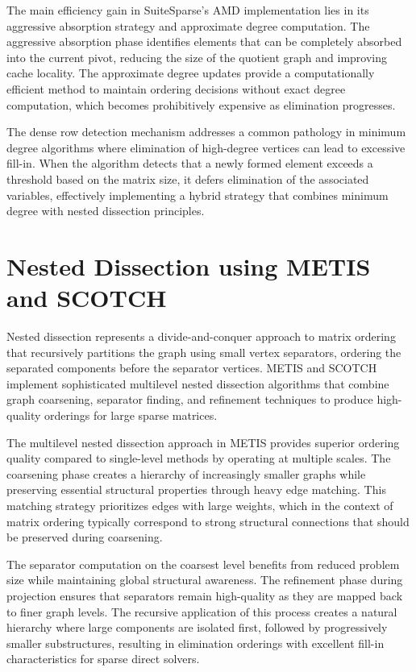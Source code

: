 The main efficiency gain in SuiteSparse's AMD implementation lies in its aggressive absorption strategy and approximate degree computation. The aggressive absorption phase identifies elements that can be completely absorbed into the current pivot, reducing the size of the quotient graph and improving cache locality. The approximate degree updates provide a computationally efficient method to maintain ordering decisions without exact degree computation, which becomes prohibitively expensive as elimination progresses.

The dense row detection mechanism addresses a common pathology in minimum degree algorithms where elimination of high-degree vertices can lead to excessive fill-in. When the algorithm detects that a newly formed element exceeds a threshold based on the matrix size, it defers elimination of the associated variables, effectively implementing a hybrid strategy that combines minimum degree with nested dissection principles.

\section{Nested Dissection using METIS and SCOTCH}
\label{sec:metis_scotch}

Nested dissection represents a divide-and-conquer approach to matrix ordering that recursively partitions the graph using small vertex separators, ordering the separated components before the separator vertices. METIS and SCOTCH implement sophisticated multilevel nested dissection algorithms that combine graph coarsening, separator finding, and refinement techniques to produce high-quality orderings for large sparse matrices.

The multilevel nested dissection approach in METIS provides superior ordering quality compared to single-level methods by operating at multiple scales. The coarsening phase creates a hierarchy of increasingly smaller graphs while preserving essential structural properties through heavy edge matching. This matching strategy prioritizes edges with large weights, which in the context of matrix ordering typically correspond to strong structural connections that should be preserved during coarsening.

The separator computation on the coarsest level benefits from reduced problem size while maintaining global structural awareness. The refinement phase during projection ensures that separators remain high-quality as they are mapped back to finer graph levels. The recursive application of this process creates a natural hierarchy where large components are isolated first, followed by progressively smaller substructures, resulting in elimination orderings with excellent fill-in characteristics for sparse direct solvers.

